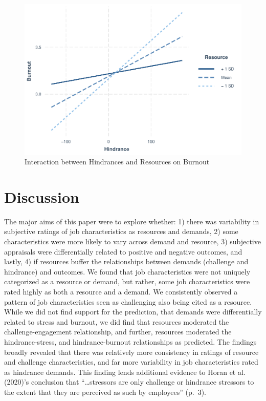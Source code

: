 \documentclass[
  man,mask]{apa7}
\begin{document}
\begin{figure}
\centering
\includegraphics{Submission_files/figure-latex/hind-resource-burn-int-1.pdf}
\caption{\label{fig:hind-resource-burn-int}Interaction between Hindrances and Resources on Burnout}
\end{figure}

\hypertarget{discussion}{%
\section{Discussion}\label{discussion}}

The major aims of this paper were to explore whether: 1) there was variability in subjective ratings of job characteristics as resources and demands, 2) some characteristics were more likely to vary across demand and resource, 3) subjective appraisals were differentially related to positive and negative outcomes, and lastly, 4) if resources buffer the relationships between demands (challenge and hindrance) and outcomes. We found that job characteristics were not uniquely categorized as a resource or demand, but rather, some job characteristics were rated highly as both a resource and a demand. We consistently observed a pattern of job characteristics seen as challenging also being cited as a resource. While we did not find support for the prediction, that demands were differentially related to stress and burnout, we did find that resources moderated the challenge-engagement relationship, and further, resources moderated the hindrance-stress, and hindrance-burnout relationships as predicted. The findings broadly revealed that there was relatively more consistency in ratings of resource and challenge characteristics, and far more variability in job characteristics rated as hindrance demands. This finding lends additional evidence to Horan et al. (2020)'s conclusion that ``\ldots stressors are only challenge or hindrance stressors to the extent that they are perceived as such by employees'' (p.~3).
\end{document}
